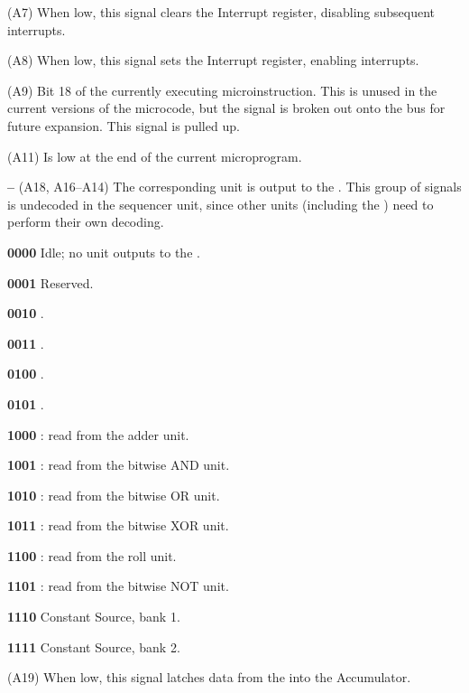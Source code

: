 \begin{description}
\item{\bfseries \CLI} (A7) When low, this signal clears the Interrupt register,
  disabling subsequent interrupts.
\item{\bfseries \STI} (A8) When low, this signal sets the Interrupt register, enabling interrupts.
\item{\bfseries \UINSTR} (A9) Bit 18 of the currently executing
  microinstruction. This is unused in the current versions of the
  microcode, but the signal is broken out onto the bus for future
  expansion. This signal is pulled up.
\item{\bfseries \END} (A11) Is low at the end of the current microprogram.
\item{\bfseries {}–} (A18, A16–A14) The corresponding
  unit is output to the \IBUS. This group of signals is undecoded in
  the sequencer unit, since other units (including the \ALU) need to
  perform their own decoding.
  \begin{description}
    \item{\bfseries \textsf{0000}} Idle; no unit outputs to the \IBUS.
    \item{\bfseries \textsf{0001}} Reserved.
    \item{\bfseries \textsf{0010}} \AGL.
    \item{\bfseries \textsf{0011}} \PC.
    \item{\bfseries \textsf{0100}} \DR.
    \item{\bfseries \textsf{0101}} \A.
    \item{\bfseries \textsf{1000}} \ALU: read from the adder unit.
    \item{\bfseries \textsf{1001}} \ALU: read from the bitwise AND unit.
    \item{\bfseries \textsf{1010}} \ALU: read from the bitwise OR unit.
    \item{\bfseries \textsf{1011}} \ALU: read from the bitwise XOR unit.
    \item{\bfseries \textsf{1100}} \ALU: read from the roll unit.
    \item{\bfseries \textsf{1101}} \ALU: read from the bitwise NOT unit.
    \item{\bfseries \textsf{1110}} Constant Source, bank 1.
    \item{\bfseries \textsf{1111}} Constant Source, bank 2.
  \end{description}
\item{\bfseries \WAC} (A19) When low, this signal latches data from the \IBUS{} into the \gls{Accumulator}.

\end{description}
